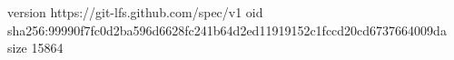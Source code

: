 version https://git-lfs.github.com/spec/v1
oid sha256:99990f7fc0d2ba596d6628fc241b64d2ed11919152c1fccd20cd6737664009da
size 15864
